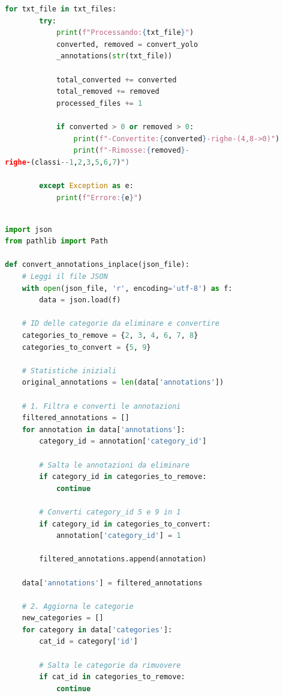 \documentclass[12pt]{article}
\begin{document}
\begin{lstlisting}[language=Python, caption={Esempio di codice per il remapping del formato YOLO}, label={lst:remapping-yolo}]
    for txt_file in txt_files:
        try:
            print(f"Processando:{txt_file}")
            converted, removed = convert_yolo
            _annotations(str(txt_file))
            
            total_converted += converted
            total_removed += removed
            processed_files += 1
            
            if converted > 0 or removed > 0:
                print(f"-Convertite:{converted}-righe-(4,8->0)")
                print(f"-Rimosse:{removed}-
righe-(classi--1,2,3,5,6,7)")
                
        except Exception as e:
            print(f"Errore:{e}")
    
\end{lstlisting}

\begin{lstlisting}[language=Python, caption={Esempio di codice per il remapping del formato COCO JSON}, label={lst:remapping-coco}]
import json
from pathlib import Path

def convert_annotations_inplace(json_file):
    # Leggi il file JSON
    with open(json_file, 'r', encoding='utf-8') as f:
        data = json.load(f)
    
    # ID delle categorie da eliminare e convertire
    categories_to_remove = {2, 3, 4, 6, 7, 8}
    categories_to_convert = {5, 9}
    
    # Statistiche iniziali
    original_annotations = len(data['annotations'])

    # 1. Filtra e converti le annotazioni
    filtered_annotations = []
    for annotation in data['annotations']:
        category_id = annotation['category_id']
        
        # Salta le annotazioni da eliminare
        if category_id in categories_to_remove:
            continue
        
        # Converti category_id 5 e 9 in 1
        if category_id in categories_to_convert:
            annotation['category_id'] = 1
        
        filtered_annotations.append(annotation)
    
    data['annotations'] = filtered_annotations
    
    # 2. Aggiorna le categorie
    new_categories = []
    for category in data['categories']:
        cat_id = category['id']
        
        # Salta le categorie da rimuovere
        if cat_id in categories_to_remove:
            continue
        

\end{lstlisting}
\end{document}
